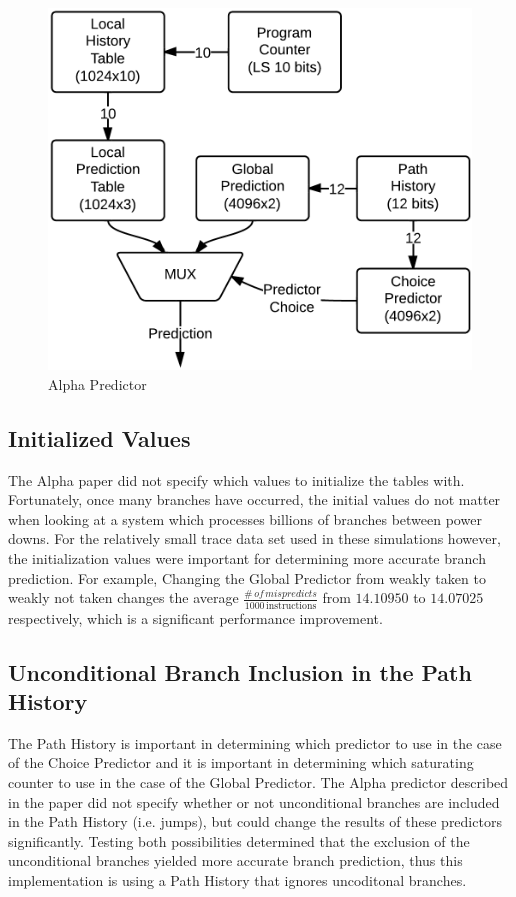 \documentclass[twocolumn]{article}
\newcommand{\centerimage}[3]{
\begin{figure}[ht!]  
\begin{center} #1
\caption{#2}
\label{#3}
\end{center}
\end{figure}}
\begin{document}
\centerimage{\includegraphics[width=\columnwidth]{AlphaPredictor.png}}{Alpha Predictor}{Alpha}
\subsection{Initialized Values}

The Alpha paper did not specify which values to initialize the tables with.
Fortunately, once many branches have occurred, the initial values do not matter
when looking at a system which processes billions of branches between power downs.
For the relatively small trace data set used in these simulations however,
the initialization values were important for determining more accurate branch prediction.
For example, Changing the Global Predictor from weakly taken to weakly not taken changes 
the average $\frac{\#\,of\,mispredicts}{1000\,\text{instructions}}$ from $14.10950$ to $14.07025$
respectively, which is a significant performance improvement.
 
\subsection{Unconditional Branch Inclusion in the Path History}

The Path History is important in determining which predictor to use
in the case of the Choice Predictor and it is important in determining
which saturating counter to use in the case of the Global Predictor.
The Alpha predictor described in the paper did not specify whether or not
unconditional branches are included in the Path History (i.e. jumps), but
could change the results of these predictors significantly. Testing both 
possibilities determined that the exclusion of the unconditional branches 
yielded more accurate branch prediction, thus this implementation is using
a Path History that ignores uncoditonal branches.
\end{document}
